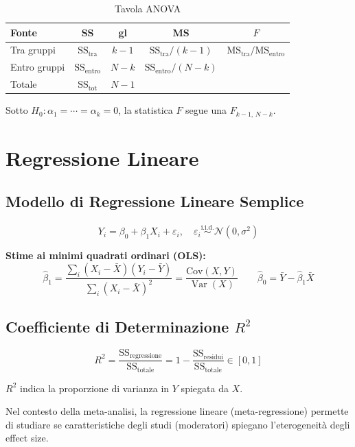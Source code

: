 \documentclass[12pt, a4paper]{article}
\DeclareMathOperator{\Var}{Var}
\newcommand{\N}{\mathcal{N}}
\newcommand{\iid}{\overset{\text{i.i.d.}}{\sim}}
\begin{document}
\begin{table}[h!]
  \centering
  \caption{Tavola ANOVA}
  \begin{tabular}{lcccc}
    \toprule
    \textbf{Fonte} & \textbf{SS} & \textbf{gl} & \textbf{MS} & \textbf{$F$} \\
    \midrule
    Tra gruppi & $\text{SS}_\text{tra}$ & $k-1$ & $\text{SS}_\text{tra}/(k-1)$ &
      $\text{MS}_\text{tra}/\text{MS}_\text{entro}$ \\
    Entro gruppi & $\text{SS}_\text{entro}$ & $N-k$ & $\text{SS}_\text{entro}/(N-k)$ & \\
    Totale & $\text{SS}_\text{tot}$ & $N-1$ & & \\
    \bottomrule
  \end{tabular}
\end{table}

Sotto $H_0: \alpha_1 = \cdots = \alpha_k = 0$, la statistica $F$ segue
una $F_{k-1,\,N-k}$.

\section{Regressione Lineare}

\subsection{Modello di Regressione Lineare Semplice}

\[
  Y_i = \beta_0 + \beta_1 X_i + \varepsilon_i,
  \quad \varepsilon_i \iid \N(0, \sigma^2)
\]

\textbf{Stime ai minimi quadrati ordinari (OLS):}
\[
  \hat\beta_1 = \frac{\sum_i (X_i - \bar X)(Y_i - \bar Y)}
                     {\sum_i (X_i - \bar X)^2}
  = \frac{\text{Cov}(X,Y)}{\Var(X)}
  \qquad
  \hat\beta_0 = \bar Y - \hat\beta_1 \bar X
\]

\subsection{Coefficiente di Determinazione $R^2$}

\[
  R^2 = \frac{\text{SS}_\text{regressione}}{\text{SS}_\text{totale}}
      = 1 - \frac{\text{SS}_\text{residui}}{\text{SS}_\text{totale}}
  \in [0,1]
\]

$R^2$ indica la proporzione di varianza in $Y$ spiegata da $X$.

\begin{nota}
  Nel contesto della meta-analisi, la regressione lineare (meta-regressione)
  permette di studiare se caratteristiche degli studi (moderatori)
  spiegano l'eterogeneità degli effect size.
\end{nota}
\end{document}
